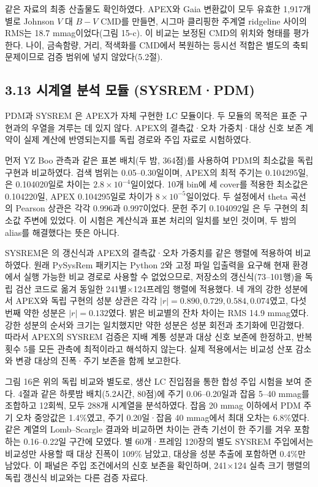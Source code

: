 같은 자료의 최종 산출물도 확인하였다. APEX와 Gaia 변환값이 모두 유효한 1,917개 별로 Johnson $V$ 대 $B-V$ CMD를 만들면, 시그마 클리핑한 주계열 ridgeline 사이의 RMS는 18.7 mmag이었다(그림 15-c). 이 비교는 보정된 CMD의 위치와 형태를 평가한다. 나이, 금속함량, 거리, 적색화를 CMD에서 복원하는 등시선 적합은 별도의 축퇴 문제이므로 검증 범위에 넣지 않았다(5.2절).



\subsection{3.13 시계열 분석 모듈 (SYSREM·PDM)}

PDM과 SYSREM \citep{tamuz2005}은 APEX가 자체 구현한 LC 모듈이다. 두 모듈의 목적은 표준 구현과의 우열을 겨루는 데 있지 않다. APEX의 결측값·오차 가중치·대상 신호 보존 계약이 실제 계산에 반영되는지를 독립 경로와 주입 자료로 시험하였다.



먼저 YZ Boo 관측과 같은 표본 배치(두 밤, 364점)를 사용하여 PDM의 최소값을 독립 \texttt{} 구현과 비교하였다. 검색 범위는 0.05–0.30일이며, APEX의 최적 주기는 0.104295일, \texttt{}은 0.104020일로 차이는 $2.8\times10^{-4}$일이었다. 10개 bin에 세 cover를 적용한 최소값은 \texttt{} 0.104220일, APEX 0.104295일로 차이가 $8\times10^{-5}$일이었다. 두 설정에서 theta 곡선의 Pearson 상관은 각각 0.996과 0.997이었다. 문헌 주기 0.104092일 \citep{yang2018}은 두 구현의 최소값 주변에 있었다. 이 시험은 계산식과 표본 처리의 일치를 보인 것이며, 두 밤의 alias를 해결했다는 뜻은 아니다.



SYSREM은 \citet{tamuz2005}의 갱신식과 APEX의 결측값·오차 가중치를 같은 행렬에 적용하여 비교하였다. 원래 PySysRem 패키지는 Python 2와 고정 파일 입출력을 요구해 현재 환경에서 실행 가능한 비교 경로로 사용할 수 없었으므로, 저장소의 \texttt{} 갱신식(73–101행)을 독립 검산 코드로 옮겨 동일한 241별×124프레임 행렬에 적용했다. 네 개의 강한 성분에서 APEX와 독립 구현의 성분 상관은 각각 $|r|=0.890, 0.729, 0.584, 0.074$였고, 다섯 번째 약한 성분은 $|r|=0.132$였다. 밝은 비교별의 잔차 차이는 RMS 14.9 mmag였다. 강한 성분의 순서와 크기는 일치했지만 약한 성분은 성분 회전과 초기화에 민감했다. 따라서 APEX의 SYSREM 검증은 지배 계통 성분과 대상 신호 보존에 한정하고, 반복 횟수 5를 모든 관측에 최적이라고 해석하지 않는다. 실제 적용에서는 비교성 산포 감소와 변광 대상의 진폭·주기 보존을 함께 보고한다.



그림 16은 위의 독립 비교와 별도로, 생산 LC 진입점을 통한 합성 주입 시험을 보여 준다. 4절과 같은 하룻밤 배치(5.2시간, 80점)에 주기 0.06–0.20일과 잡음 5–40 mmag를 조합하고 12회씩, 모두 288개 시계열을 분석하였다. 잡음 20 mmag 이하에서 PDM 주기 오차 중앙값은 1.4\%였고, 주기 0.20일·잡음 40 mmag에서 최대 오차는 6.8\%였다. 같은 계열의 Lomb–Scargle 결과와 비교하면 차이는 관측 기선이 한 주기를 겨우 포함하는 0.16–0.22일 구간에 모였다. 별 60개·프레임 120장의 별도 SYSREM 주입에서는 비교성만 사용할 때 대상 진폭이 109\% 남았고, 대상을 성분 추출에 포함하면 0.4\%만 남았다. 이 패널은 주입 조건에서의 신호 보존을 확인하며, 241×124 실측 크기 행렬의 독립 갱신식 비교와는 다른 검증 자료다.



